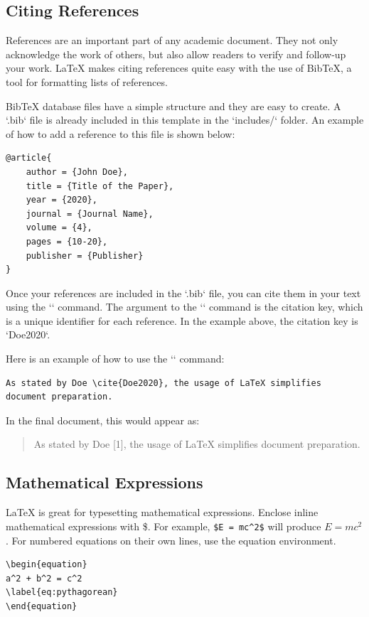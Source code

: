 \subsection{Citing References}

References are an important part of any academic document. They not only acknowledge the work of others, but also allow readers to verify and follow-up your work. LaTeX makes citing references quite easy with the use of BibTeX, a tool for formatting lists of references.

BibTeX database files have a simple structure and they are easy to create. A `.bib` file is already included in this template in the `includes/` folder. An example of how to add a reference to this file is shown below:

\begin{verbatim}
@article{
    author = {John Doe},
    title = {Title of the Paper},
    year = {2020},
    journal = {Journal Name},
    volume = {4},
    pages = {10-20},
    publisher = {Publisher}
}
\end{verbatim}

Once your references are included in the `.bib` file, you can cite them in your text using the `\cite{}` command. The argument to the `\cite{}` command is the citation key, which is a unique identifier for each reference. In the example above, the citation key is `Doe2020`.

Here is an example of how to use the `\cite{}` command:

\begin{verbatim}
As stated by Doe \cite{Doe2020}, the usage of LaTeX simplifies document preparation.
\end{verbatim}

In the final document, this would appear as:

\begin{quote}
As stated by Doe [1], the usage of LaTeX simplifies document preparation.
\end{quote}


\subsection{Mathematical Expressions}
LaTeX is great for typesetting mathematical expressions. Enclose inline mathematical expressions with \$. For example, \verb|$E = mc^2$| will produce \(E = mc^2\). For numbered equations on their own lines, use the equation environment.

\begin{verbatim}
\begin{equation}
a^2 + b^2 = c^2
\label{eq:pythagorean}
\end{equation}
\end{verbatim}


